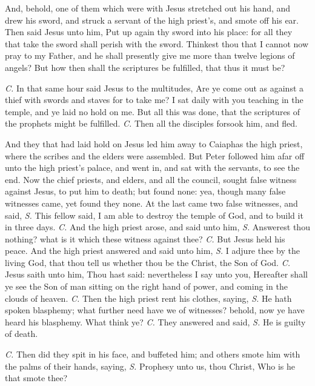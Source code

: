 And, behold, one of them which were with Jesus stretched out his hand, and drew his sword, and struck a servant of the high priest's, and smote off his ear. Then said Jesus unto him, {} Put up again thy sword into his place: for all they that take the sword shall perish with the sword. Thinkest thou that I cannot now pray to my Father, and he shall presently give me more than twelve legions of angels? But how then shall the scriptures be fulfilled, that thus it must be?

\textit{C.} In that same hour said Jesus to the multitudes, {} Are ye come out as against a thief with swords and staves for to take me? I sat daily with you teaching in the temple, and ye laid no hold on me. But all this was done, that the scriptures of the prophets might be fulfilled. \textit{C.} Then all the disciples forsook him, and fled.

And they that had laid hold on Jesus led him away to Caiaphas the high priest, where the scribes and the elders were assembled. But Peter followed him afar off unto the high priest's palace, and went in, and sat with the servants, to see the end. Now the chief priests, and elders, and all the council, sought false witness against Jesus, to put him to death; but found none: yea, though many false witnesses came, yet found they none. At the last came two false witnesses, and said, \textit{S.} This fellow said, I am able to destroy the temple of God, and to build it in three days. \textit{C.} And the high priest arose, and said unto him, \textit{S.} Answerest thou nothing? what is it which these witness against thee? \textit{C.} But Jesus held his peace. And the high priest answered and said unto him, \textit{S.} I adjure thee by the living God, that thou tell us whether thou be the Christ, the Son of God. \textit{C.} Jesus saith unto him, {} Thou hast said: nevertheless I say unto you, Hereafter shall ye see the Son of man sitting on the right hand of power, and coming in the clouds of heaven. \textit{C.} Then the high priest rent his clothes, saying, \textit{S.} He hath spoken blasphemy; what further need have we of witnesses? behold, now ye have heard his blasphemy. What think ye? \textit{C.} They answered and said, \textit{S.} He is guilty of death.

\textit{C.} Then did they spit in his face, and buffeted him; and others smote him with the palms of their hands, saying, \textit{S.} Prophesy unto us, thou Christ, Who is he that smote thee?

